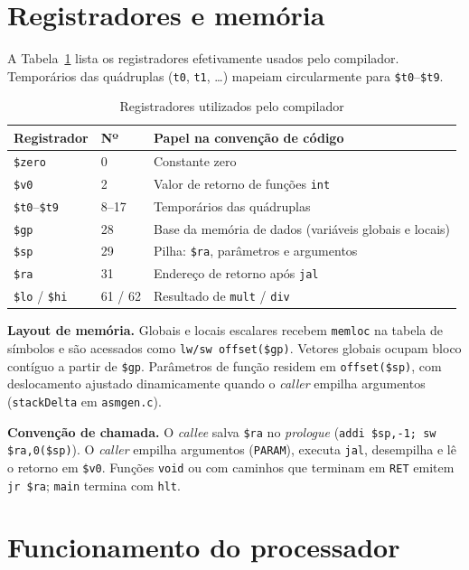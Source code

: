 \documentclass[
	12pt,				%
	openright,			%
	a4paper,			%
	english,			%
	french,				%
	spanish,			%
	brazil,				%
	]{abntex2}
\begin{document}
\section{Registradores e memória}

A Tabela~\ref{tab:registradores} lista os registradores efetivamente usados pelo compilador. Temporários das quádruplas (\texttt{t0}, \texttt{t1}, \ldots) mapeiam circularmente para \texttt{\$t0}--\texttt{\$t9}.

\begin{table}[H]
\centering
\caption{Registradores utilizados pelo compilador}
\label{tab:registradores}
\begin{tabular}{|l|l|p{7cm}|}
\hline
\textbf{Registrador} & \textbf{Nº} & \textbf{Papel na convenção de código} \\
\hline
\texttt{\$zero} & 0 & Constante zero \\
\texttt{\$v0} & 2 & Valor de retorno de funções \texttt{int} \\
\texttt{\$t0}--\texttt{\$t9} & 8--17 & Temporários das quádruplas \\
\texttt{\$gp} & 28 & Base da memória de dados (variáveis globais e locais) \\
\texttt{\$sp} & 29 & Pilha: \texttt{\$ra}, parâmetros e argumentos \\
\texttt{\$ra} & 31 & Endereço de retorno após \texttt{jal} \\
\texttt{\$lo} / \texttt{\$hi} & 61 / 62 & Resultado de \texttt{mult} / \texttt{div} \\
\hline
\end{tabular}
\end{table}

\textbf{Layout de memória.} Globais e locais escalares recebem \texttt{memloc} na tabela de símbolos e são acessados como \texttt{lw/sw offset(\$gp)}. Vetores globais ocupam bloco contíguo a partir de \texttt{\$gp}. Parâmetros de função residem em \texttt{offset(\$sp)}, com deslocamento ajustado dinamicamente quando o \emph{caller} empilha argumentos (\texttt{stackDelta} em \texttt{asmgen.c}).

\textbf{Convenção de chamada.} O \emph{callee} salva \texttt{\$ra} no \emph{prologue} (\texttt{addi \$sp,-1; sw \$ra,0(\$sp)}). O \emph{caller} empilha argumentos (\texttt{PARAM}), executa \texttt{jal}, desempilha e lê o retorno em \texttt{\$v0}. Funções \texttt{void} ou com caminhos que terminam em \texttt{RET} emitem \texttt{jr \$ra}; \texttt{main} termina com \texttt{hlt}.

\section{Funcionamento do processador}
\end{document}
